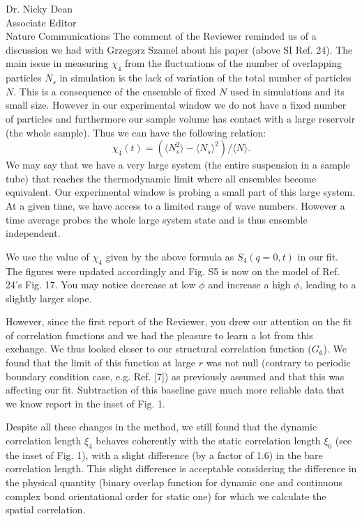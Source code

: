 \documentclass[a4paper, rebuttal, parskip=true, firsthead=false, fromemail=true, foldmarks=false]{scrlttr2}
\begin{document}
\begin{letter}{Dr. Nicky Dean\\
Associate Editor\\
Nature Communications}
The comment of the Reviewer reminded us of a discussion we had with Grzegorz Szamel about his paper (above SI Ref. 24). The main issue in measuring $\chi_4$ from the fluctuations of the number of overlapping particles $N_s$ in simulation is the lack of variation of the total number of particles $N$. This is a consequence of the ensemble of fixed $N$ used in simulations and its small size. However in our experimental window we do not have a fixed number of particles and furthermore our sample volume has contact with a large reservoir 
(the whole sample). Thus we can have the following relation:
\[
\chi_4(t) = (\langle N_s^2\rangle - \langle N_s\rangle^2) /  \langle N\rangle. 
\]
We may say that we have a very large system (the entire suspension in a sample tube) that reaches the thermodynamic limit where all ensembles become equivalent. Our experimental window is probing a small part of this large system. At a given time, we have access to a limited range of wave numbers. However a time average probes the whole large system state and is thus ensemble independent.

We use the value of $\chi_4$ given by the above formula as $S_4(q=0,t)$ in our fit. The figures were updated accordingly and Fig. S5 is now on the model of Ref. 24's Fig. 17. You may notice decrease at low $\phi$ and increase a high $\phi$, leading to a slightly larger slope. 

However, since the first report of the Reviewer, you drew our attention on the fit of correlation functions and we had the pleasure to learn a lot from this exchange. We thus looked closer to our structural correlation function ($G_6$). We found that the limit of this function at large $r$ was not null (contrary to periodic boundary condition case, e.g. Ref. [7]) as previously assumed and that this was affecting our fit. Subtraction of this baseline gave much more reliable data that we know report in the inset of Fig. 1.

Despite all these changes in the method, we still found that the dynamic correlation length $\xi_4$ behaves coherently with the static correlation length $\xi_6$ (see the inset of Fig. 1), 
with a slight difference (by a factor of 1.6) in the bare correlation length. This slight difference is acceptable considering the difference in the 
physical quantity (binary overlap function 
for dynamic one and continuous complex bond orientational order for static one) for which we calculate the spatial correlation.  


\end{letter}
\end{document}

